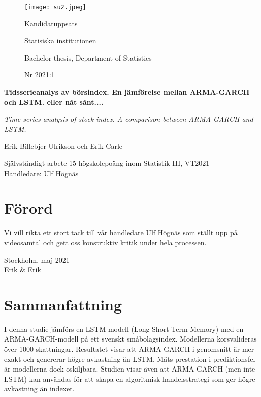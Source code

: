 \documentclass[11pt]{article}
\numberwithin{equation}{section}
\numberwithin{table}{section}
\numberwithin{figure}{section}
\begin{document}
\begin{titlepage}
\thispagestyle{empty}
	\begin{figure}[ht]
			\texttt{[image: su2.jpeg]}
			
	   \endminipage
		 \Large Kandidatuppsats \par
		 \large Statisiska institutionen \par
		  \small Bachelor thesis, Department of   Statistics \par
		   \large Nr 2021:1 \par
			
\endminipage
\end{figure}
	
	
\centering
\vspace{5cm}

{\large\bfseries Tidsserieanalys av börsindex. En jämförelse mellan ARMA-GARCH och LSTM. eller nåt sånt....\par}
	\vspace{0.5cm}
	
{\large\itshape Time series analysis of stock index. A comparison between ARMA-GARCH and LSTM. \par}
	\vfill
	
	

{\Large Erik Billebjer Ulrikson och Erik Carle\par}
	\vspace{0.5cm}
	
\begin{flushleft}
Självständigt arbete 15 högskolepoäng inom Statistik III, VT2021 \\
Handledare: Ulf Högnäs\\

\end{flushleft}
\end{titlepage}

\newpage
\section*{Förord}
Vi vill rikta ett stort tack till vår handledare Ulf Högnäs som ställt upp på
videosamtal och gett oss konstruktiv kritik under hela processen. \bigbreak

Stockholm, maj 2021 \\
Erik \& Erik
\null
\newpage

\newpage
\thispagestyle{empty}
\section*{Sammanfattning}
I denna studie jämförs en LSTM-modell (Long Short-Term Memory) med en ARMA-GARCH-modell på ett svenskt småbolagsindex. Modellerna korsvalideras över 1000 skattningar. Resultatet visar att ARMA-GARCH i genomsnitt är mer exakt och genererar högre avkastning än LSTM. Mäts prestation i prediktionsfel är modellerna dock oskiljbara. Studien visar även att ARMA-GARCH (men inte LSTM) kan användas för att skapa en algoritmisk handelsstrategi som ger högre avkastning än indexet.
\end{document}
